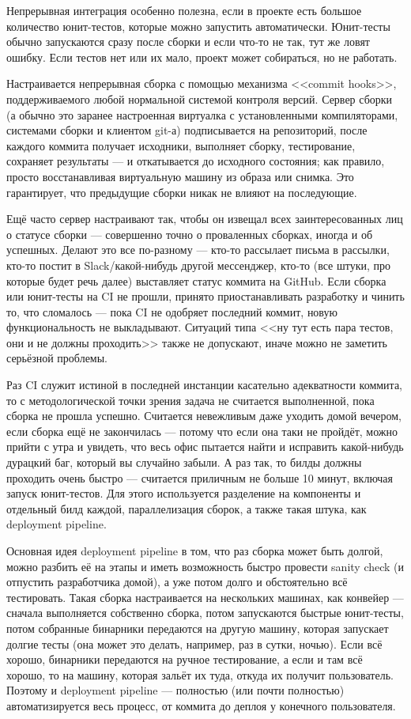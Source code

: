 \documentclass[a5paper]{article}
\begin{document}
Непрерывная интеграция особенно полезна, если в проекте есть большое количество юнит-тестов, которые можно запустить автоматически. Юнит-тесты обычно запускаются сразу после сборки и если что-то не так, тут же ловят ошибку. Если тестов нет или их мало, проект может собираться, но не работать.

Настраивается непрерывная сборка с помощью механизма <<commit hooks>>, поддерживаемого любой нормальной системой контроля версий. Сервер сборки (а обычно это заранее настроенная виртуалка с установленными компиляторами, системами сборки и клиентом git-а) подписывается на репозиторий, после каждого коммита получает исходники, выполняет сборку, тестирование, сохраняет результаты --- и откатывается до исходного состояния; как правило, просто восстанавливая виртуальную машину из образа или снимка. Это гарантирует, что предыдущие сборки никак не влияют на последующие.

Ещё часто сервер настраивают так, чтобы он извещал всех заинтересованных лиц о статусе сборки --- совершенно точно о проваленных сборках, иногда и об успешных. Делают это все по-разному --- кто-то рассылает письма в рассылки, кто-то постит в Slack/какой-нибудь другой мессенджер, кто-то (все штуки, про которые будет речь далее) выставляет статус коммита на GitHub. Если сборка или юнит-тесты на CI не прошли, принято приостанавливать разработку и чинить то, что сломалось --- пока CI не одобряет последний коммит, новую функциональность не выкладывают. Ситуаций типа <<ну тут есть пара тестов, они и не должны проходить>> также не допускают, иначе можно не заметить серьёзной проблемы.

Раз CI служит истиной в последней инстанции касательно адекватности коммита, то с методологической точки зрения задача не считается выполненной, пока сборка не прошла успешно. Считается невежливым даже уходить домой вечером, если сборка ещё не закончилась --- потому что если она таки не пройдёт, можно прийти с утра и увидеть, что весь офис пытается найти и исправить какой-нибудь дурацкий баг, который вы случайно забыли. А раз так, то билды должны проходить очень быстро --- считается приличным не больше 10 минут, включая запуск юнит-тестов. Для этого используется разделение на компоненты и отдельный билд каждой, параллелизация сборок, а также такая штука, как deployment pipeline.

Основная идея deployment pipeline в том, что раз сборка может быть долгой, можно разбить её на этапы и иметь возможность быстро провести sanity check (и отпустить разработчика домой), а уже потом долго и обстоятельно всё тестировать. Такая сборка настраивается на нескольких машинах, как конвейер --- сначала выполняется собственно сборка, потом запускаются быстрые юнит-тесты, потом собранные бинарники передаются на другую машину, которая запускает долгие тесты (она может это делать, например, раз в сутки, ночью). Если всё хорошо, бинарники передаются на ручное тестирование, а если и там всё хорошо, то на машину, которая зальёт их туда, откуда их получит пользователь. Поэтому и deployment pipeline --- полностью (или почти полностью) автоматизируется весь процесс, от коммита до деплоя у конечного пользователя.
\end{document}
